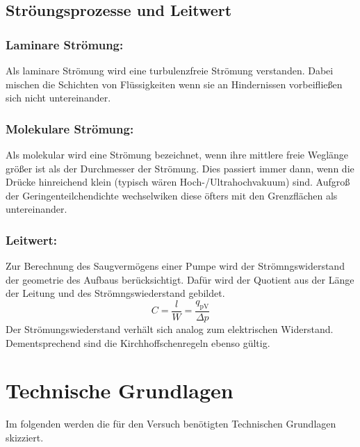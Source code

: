 \subsection{Ströungsprozesse und Leitwert}

\subsubsection{Laminare Strömung:}
Als laminare Strömung wird eine turbulenzfreie Strömung verstanden. Dabei mischen die Schichten von Flüssigkeiten wenn sie an Hindernissen vorbeifließen sich nicht untereinander.

\subsubsection{Molekulare Strömung:}
Als molekular wird eine Strömung bezeichnet, wenn ihre mittlere freie Weglänge größer ist als der Durchmesser der Strömung. Dies passiert immer dann, wenn die Drücke hinreichend klein (typisch wären Hoch-/Ultrahochvakuum) sind. Aufgroß der Geringenteilchendichte wechselwiken diese öfters mit den Grenzflächen als untereinander.

\subsubsection{Leitwert:}
Zur Berechnung des Saugvermögens einer Pumpe wird der Strömngswiderstand der geometrie des Aufbaus berücksichtigt. Dafür wird der Quotient aus der Länge der Leitung und des Strömngswiederstand gebildet.
\begin{equation}
  C = \frac{l}{W} = \frac{q_\text{pV}}{\Delta p}
\end{equation}
Der Strömungswiederstand verhält sich analog zum elektrischen Widerstand. Dementsprechend sind die Kirchhoffschenregeln ebenso gültig. 

\section{Technische Grundlagen}
Im folgenden werden die für den Versuch benötigten Technischen Grundlagen skizziert.
